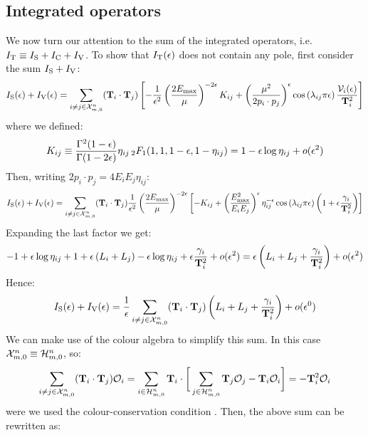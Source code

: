 \subsection{Integrated operators}

We now turn our attention to the sum of the integrated operators, i.e. $ I_\text{T} \equiv I_\text{S} + I_\text{C} + I_\text{V} $. To show that $ I_\text{T}(\epsilon) $ does not contain any pole, first consider the sum $ I_\text{S} + I_\text{V} $:
\begin{equation*}
  I_\text{S}(\epsilon) + I_\text{V}(\epsilon) = \sum_{i \neq j \in \mathcal{X}^{n}_{m,0}} (\mathbf{T}_i \cdot \mathbf{T}_j) \left[ - \frac{1}{\epsilon^2} \left( \frac{2E_\text{max}}{\mu} \right)^{-2\epsilon} K_{ij} + \left( \frac{\mu^2}{2p_i \cdot p_j} \right)^\epsilon \cos \left( \lambda_{ij} \pi \epsilon \right) \frac{\mathcal{V}_i(\epsilon)}{\mathbf{T}_i^2} \right]
\end{equation*}
where we defined:
\begin{equation}
  K_{ij} \equiv \frac{\Gamma^2(1-\epsilon)}{\Gamma(1-2\epsilon)} \eta_{ij} \,{_2F_1}(1,1,1-\epsilon,1-\eta_{ij}) = 1 - \epsilon \log \eta_{ij} + o(\epsilon^2)
\end{equation}
Then, writing $ 2p_i \cdot p_j = 4E_i E_j \eta_{ij} $:
\begin{equation*}
  I_\text{S}(\epsilon) + I_\text{V}(\epsilon) = \sum_{i \neq j \in \mathcal{X}^{n}_{m,0}} (\mathbf{T}_i \cdot \mathbf{T}_j) \frac{1}{\epsilon^2} \left( \frac{2E_\text{max}}{\mu} \right)^{-2\epsilon} \left[ - K_{ij} + \left( \frac{E_\text{max}^2}{E_i E_j} \right)^\epsilon \eta_{ij}^{-\epsilon} \cos \left( \lambda_{ij} \pi \epsilon \right) \left( 1 + \epsilon \frac{\gamma_i}{\mathbf{T}_i^2} \right) \right]
\end{equation*}
Expanding the last factor we get:
\begin{equation*}
  - 1 + \epsilon \log \eta_{ij} + 1 + \epsilon \left( L_i + L_j \right) - \epsilon \log \eta_{ij} + \epsilon \frac{\gamma_i}{\mathbf{T}_i^2} + o(\epsilon^2) = \epsilon \left( L_i + L_j + \frac{\gamma_i}{\mathbf{T}_i^2} \right) + o(\epsilon^2)
\end{equation*}
Hence:
\begin{equation}
  I_\text{S}(\epsilon) + I_\text{V}(\epsilon) = \frac{1}{\epsilon} \sum_{i \neq j \in \mathcal{X}^{n}_{m,0}} (\mathbf{T}_i \cdot \mathbf{T}_j) \left( L_i + L_j + \frac{\gamma_i}{\mathbf{T}_i^2} \right) + o(\epsilon^0)
  \label{eq:isv-exp}
\end{equation}
We can make use of the colour algebra to simplify this sum. In this case $ \mathcal{X}^{n}_{m,0} \equiv \mathcal{H}^{n}_{m,0} $, so:
\begin{equation}
  \sum_{i \neq j \in \mathcal{X}^{n}_{m,0}} (\mathbf{T}_i \cdot \mathbf{T}_j) \mathcal{O}_i = \sum_{i \in \mathcal{H}^{n}_{m,0}} \mathbf{T}_i \cdot \bigg[ \sum_{j \in \mathcal{H}^{n}_{m,0}} \mathbf{T}_j \mathcal{O}_j - \mathbf{T}_i \mathcal{O}_i \bigg] = - \mathbf{T}_i^2 \mathcal{O}_i
\end{equation}
were we used the colour-conservation condition . Then, the above sum can be rewritten as:

